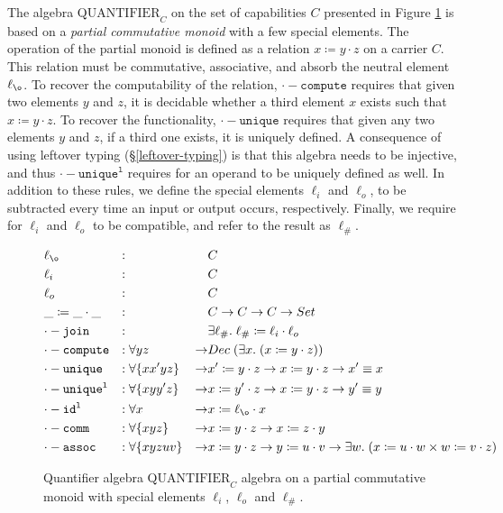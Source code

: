 \documentclass[a4paper,UKenglish,cleveref, autoref, thm-restate,authorcolumns]{lipics-v2019}
\newcommand{\op}[3]{#1 \coloneqq #2 \cdot #3}
\newcommand{\Quantifier}{\mathrm{QUANTIFIER}}
\newcommand{\constr}[1]{\mathtt{#1}}
\begin{document}
The algebra $\Quantifier_C$ on the set of capabilities $C$ presented in Figure \ref{capabilities} is based on a \emph{partial commutative monoid} with a few special elements.
The operation of the partial monoid is defined as a relation $\op{x}{y}{z}$ on a carrier $C$.
This relation must be commutative, associative, and absorb the neutral element $\ell_{\o}$.
To recover the computability of the relation, $\constr{\cdot-compute}$ requires that given two elements $y$ and $z$, it is decidable whether a third element $x$ exists such that $\op{x}{y}{z}$.
To recover the functionality, $\constr{\cdot-unique}$ requires that given any two elements $y$ and $z$, if a third one exists, it is uniquely defined.
A consequence of using leftover typing (\S \ref{leftover-typing}) is that this algebra needs to be injective, and thus $\constr{\cdot-unique^l}$ requires for an operand to be uniquely defined as well.
In addition to these rules, we define the special elements $\ell_i$ and $\ell_o$, to be subtracted every time an input or output occurs, respectively.
Finally, we require for $\ell_i$ and $\ell_o$ to be compatible, and refer to the result as $\ell_\#$.

\begin{figure}[h]
\begin{equation}
\begin{aligned}
  &\ell_{\o}                &:{} &                      &     & C \\
  &\ell_i                   &:{} &                      &     & C \\
  &\ell_o                   &:{} &                      &     & C \\
  &\op{\_}{\_}{\_}          &:{} &                      &     & C \to C \to C \to Set \\
  &\constr{\cdot-join}      &:{} &                      &     & \exists \ell_\# . \; \op{\ell_\#}{\ell_i}{\ell_o} \\
  &\constr{\cdot-compute}   &:{} &\forall y z           & \to & Dec \; (\exists x . \; (\op{x}{y}{z})) \\
  &\constr{\cdot-unique}    &:{} &\forall \{x x' y z\}  & \to & \op{x'}{y}{z} \to \op{x}{y}{z} \to x' \equiv x \\
  &\constr{\cdot-unique^l}  &:{} &\forall \{x y y' z\}  & \to & \op{x}{y'}{z} \to \op{x}{y}{z} \to y' \equiv y \\
  &\constr{\cdot-id^l}      &:{} &\forall x             & \to & \op{x}{\ell_{\o}}{x} \\
  &\constr{\cdot-comm}      &:{} &\forall \{x y z\}     & \to & \op{x}{y}{z} \to \op{x}{z}{y} \\
  &\constr{\cdot-assoc}     &:{} &\forall \{x y z u v\} & \to & \op{x}{y}{z} \to \op{y}{u}{v} \to \exists w . \; (\op{x}{u}{w} \times \op{w}{v}{z})
\end{aligned}
\end{equation}
\caption{Quantifier algebra $\Quantifier_C$ algebra on a partial commutative monoid with special elements $\ell_i$, $\ell_o$ and $\ell_\#$.}
\label{capabilities}
\end{figure}
\end{document}
